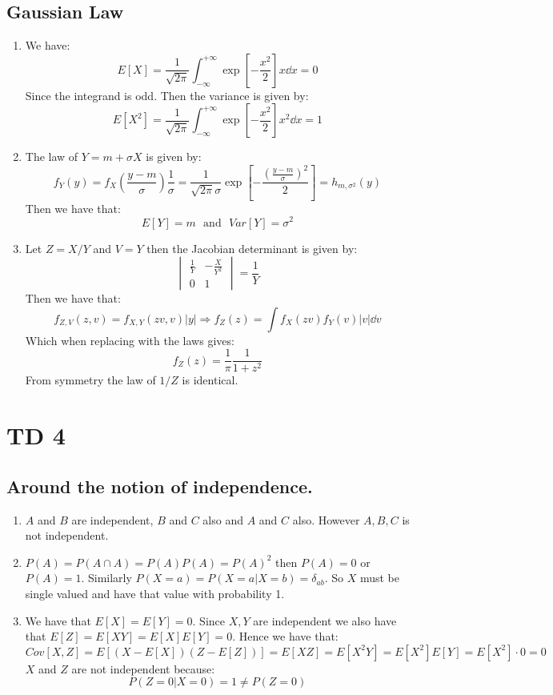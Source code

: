 \documentclass[10pt,a4paper]{book}
\begin{document}
\section{Gaussian Law}

\begin{enumerate}

\item We have:
\[
E[X] = \frac{1}{\sqrt{2\pi}}\int_{-\infty}^{+\infty} \exp[-\frac{x^2}{2}] x \dd x = 0
\]
Since the integrand is odd. Then the variance is given by:
\[
E[X^2] = \frac{1}{\sqrt{2 \pi}} \int_{-\infty}^{+\infty} \exp[-\frac{x^2}{2}] x^2 \dd x = 1
\]

\item The law of $Y = m + \sigma X$ is given by:
\[
f_Y(y) = f_X(\frac{y - m}{\sigma}) \frac{1}{\sigma} = \frac{1}{\sqrt{2\pi} \sigma} \exp[- \frac{(\frac{y - m}{\sigma})^2}{2}]  = h_{m, \sigma^2}(y)
\]
Then we have that:
\[
E[Y] = m \mbox{~~and~~} Var[Y] = \sigma^2
\]

\item Let $Z = X/Y$ and $V = Y$ then the Jacobian determinant is given by:
\[
\begin{vmatrix}
\frac{1}{Y} & -\frac{X}{Y^2}\\
0 & 1
\end{vmatrix} = \frac{1}{Y}
\]
Then we have that:
\[
f_{Z, V}(z, v) = f_{X, Y}(zv, v) |y| \Rightarrow f_Z(z) = \int f_{X}(zv)f_Y(v)|v| \dd v
\]
Which when replacing with the laws gives:
\[
f_{Z}(z) = \frac{1}{\pi} \frac{1}{1 + z^2}
\]
From symmetry the law of $1/Z$ is identical.

\end{enumerate}

\chapter{TD 4}
\section{Around the notion of independence.}
\begin{enumerate}
\item $A$ and $B$ are independent, $B$ and $C$ also and $A$ and $C$ also. However $A, B, C$ is not independent.

\item $P(A) = P(A \cap A) = P(A)P(A) = P(A)^2$ then $P(A) = 0$ or $P(A) = 1$. Similarly $P(X = a) = P(X = a | X = b) = \delta_{ab}$. So $X$ must be single valued and have that value with probability 1.

\item  We have that $E[X] = E[Y] = 0$. Since $X, Y$ are independent we also have that $E[Z] = E[XY] = E[X]E[Y] = 0$. Hence we have that:
\[
Cov[X, Z] = E[(X - E[X])(Z - E[Z])] = E[XZ] = E[X^2 Y] = E[X^2]E[Y] = E[X^2] \cdot 0 = 0
\]
$X$ and $Z$ are not independent because:
\[
P(Z = 0| X = 0) = 1 \neq P(Z = 0)
\]

\end{enumerate}
\end{document}
